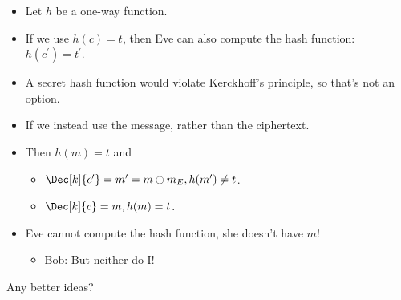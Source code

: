 \begin{frame}
  \begin{example}
    \begin{itemize}
      \item Let \(h\) be a one-way function.
        
        \pause{}
        
      \item If we use \(h(c) = t\), then Eve can also compute the hash 
        function: \(h(c^\prime) = t^\prime\).

        \pause{}

      \item A secret hash function would violate Kerckhoff's principle, so 
        that's not an option.

        \pause{}

      \item If we instead use the message, rather than the ciphertext.
        
      \item Then \(h(m) = t\) and
        \begin{itemize}
          \item \(\Dec[k]{c^\prime} = m^\prime = m\oplus m_E, h(m^\prime)\neq 
              t\).
          \item \(\Dec[k]{c} = m, h(m) = t\).
        \end{itemize}

        \pause{}
        
      \item Eve cannot compute the hash function, she doesn't have \(m\)!
        \pause{}
        \begin{itemize}
          \item Bob: But neither do I\@!
        \end{itemize}
    \end{itemize}
  \end{example}

  \pause{}

  \begin{exercise}
    Any better ideas?
  \end{exercise}
\end{frame}

